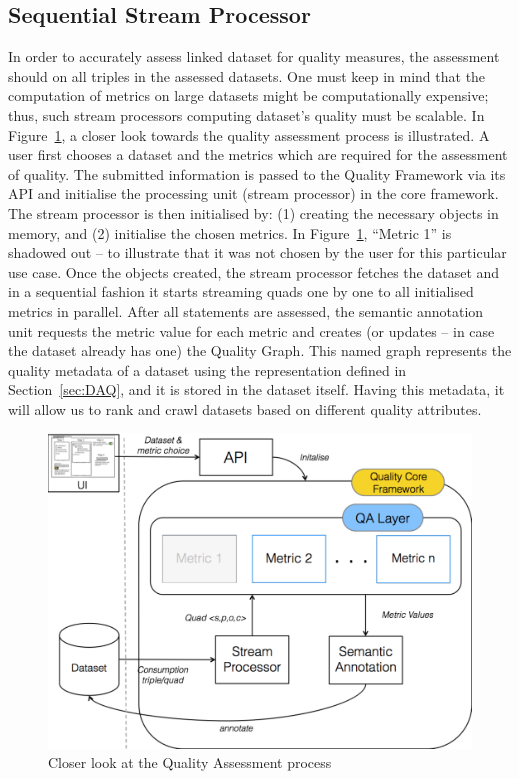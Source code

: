 
\subsection{Sequential Stream Processor}
\label{sec:StreamProcessor} 
In order to accurately assess linked dataset for quality measures, the assessment should on all triples in the assessed datasets.
One must keep in mind that the computation of metrics on large datasets might be computationally expensive; thus, such stream processors computing dataset's quality must be scalable.
In Figure~\ref{fig:closerLook}, a closer look towards the quality assessment process is illustrated.
A user first chooses a dataset and the metrics which are required for the assessment of quality.
The submitted information is passed to the Quality Framework via its API and initialise the processing unit (stream processor) in the core framework.
The stream processor is then initialised by: (1) creating the necessary objects in memory, and (2) initialise the chosen metrics. 
In Figure~\ref{fig:closerLook}, ``Metric 1'' is shadowed out – to illustrate that it was not chosen by the user for this particular use case.
Once the objects created, the stream processor fetches the dataset and in a sequential fashion it starts streaming quads one by one to all initialised metrics in parallel.
After all statements are assessed, the semantic annotation unit requests the metric value for each metric and creates (or updates – in case the dataset already has one) the Quality Graph.
This named graph represents the quality metadata of a dataset using the representation defined in Section~\ref{sec:DAQ}, and it is stored in the dataset itself.
Having this metadata, it will allow us to rank and crawl datasets based on different quality attributes.

\begin{figure}[tbph]
\center
\includegraphics[scale=0.3]{images/closerLook.pdf} 
\caption{Closer look at the Quality Assessment process} 
\label{fig:closerLook}
\end{figure}


